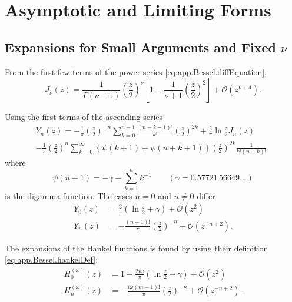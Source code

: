 \section{Asymptotic and Limiting Forms}
\subsection{Expansions for Small Arguments and Fixed $\nu$}\label{sec:app.Bessel.smallArguments}
From the first few terms of the power series \eqref{eq:app.Bessel.diffEquation}, 
  \begin{equation}
    J_\nu(z) = \frac{1}{\Gamma(\nu+1)}\left(\frac{z}{2}\right)^\nu\left[1-\frac{1}{\nu+1}\left(\frac{z}{2}\right)^2\right]+\mathcal{O}(z^{\nu+4}).
  \end{equation}
  
Using the first terms of the ascending series \cite[\S9.1.11]{ABR1965}
  \begin{multline}
   Y_n(z)=-\frac{1}{\pi}\left(\frac{z}{2}\right)^{-n}\sum_{k=0}^{n-1}\frac{(n-k-1)!}{k!}\left(\frac{z}{2}\right)^{2k}
      +\frac{2}{\pi}\ln\frac{z}{2}J_n(z)
      \\-\frac{1}{\pi}\left(\frac{z}{2}\right)^n\sum_{k=0}^\infty\left\{\psi(k+1)+\psi(n+k+1)\right\}\left(\frac{z}{2}\right)^{2k}\frac{1}{k!(n+k)!},
  \end{multline}
where 
  \begin{equation}
   \psi(n+1) = -\gamma +\sum_{k=1}^nk^{-1}\qquad(\gamma=0.57721\,56649\ldots)
  \end{equation}
is the digamma function. The cases $n=0$ and $n\neq0$ differ
  \begin{align}
   Y_0(z)	&= \frac{2}{\pi}\left(\ln\frac{z}{2}+\gamma\right)+\mathcal{O}(z^2)	\\
   Y_n(z)	&= -\frac{(n-1)!}{\pi}\left(\frac{z}{2}\right)^{-n} +\mathcal{O}(z^{-n+2}).
  \end{align}

The expansions of the Hankel functions is found by using 
their definition \eqref{eq:app.Bessel.hankelDef}:
  \begin{align}
   H_0^{(\omega)}(z)	&=1+\frac{2i\omega}{\pi}\left(\ln\frac{z}{2}+\gamma\right)+\mathcal{O}(z^2)	\\
   H_n^{(\omega)}(z)	&=-\frac{i\omega(m-1)!}{\pi}\left(\frac{z}{2}\right)^{-n}+\mathcal{O}(z^{-n+2}).
  \end{align}


